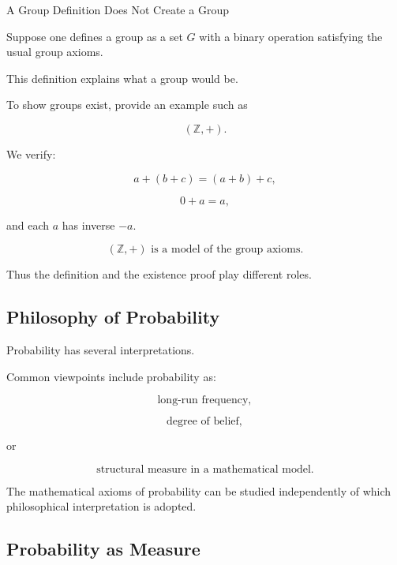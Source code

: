 \begin{workedexamplebox}{A Group Definition Does Not Create a Group}

Suppose one defines a group as a set \(G\) with a binary operation satisfying
the usual group axioms.

This definition explains what a group would be.

To show groups exist, provide an example such as

\[
(\mathbb{Z},+).
\]

We verify:

\[
a+(b+c)=(a+b)+c,
\]

\[
0+a=a,
\]

and each \(a\) has inverse \(-a\).

\begin{answerbox}
\[
\boxed{
(\mathbb{Z},+)
\text{ is a model of the group axioms}.
}
\]
\end{answerbox}

Thus the definition and the existence proof play different roles.

\end{workedexamplebox}

\subsection{Philosophy of Probability}
\label{subsec:philosophy-probability}

Probability has several interpretations.

Common viewpoints include probability as:

\[
\boxed{
\text{long-run frequency},
}
\]

\[
\boxed{
\text{degree of belief},
}
\]

or

\[
\boxed{
\text{structural measure in a mathematical model}.
}
\]

The mathematical axioms of probability can be studied independently of
which philosophical interpretation is adopted.

\subsection{Probability as Measure}
\label{subsec:probability-as-measure-philosophy}

